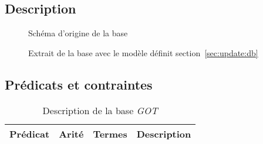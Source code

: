 \subsection{Description}

\begin{figure}[H]
    \caption{Schéma d'origine de la base }
\end{figure}

\begin{figure}[H]
    \caption{Extrait de la base  avec le modèle définit section~\ref{sec:update:db}}
\end{figure}

\subsection{Prédicats et contraintes}

\begin{table}[H]
    \centering
    \begin{adjustbox}{width=\linewidth}
        \begin{tabular}{l|c|l|l}
            Prédicat & Arité & Termes & Description \\
            \hline
            \hline
        \end{tabular}
    \end{adjustbox}
    \caption{Description de la base \textit{GOT}}
\end{table}

